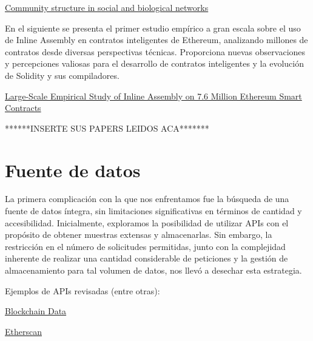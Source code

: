 \documentclass{article}
\begin{document}
\href{https://www.ncbi.nlm.nih.gov/pmc/articles/PMC122977/pdf/pq1202007821.pdf}{Community structure in social and
biological networks}
\newline

En el siguiente se presenta el primer estudio empírico a gran escala sobre el uso de Inline Assembly en contratos inteligentes de Ethereum, analizando millones de contratos desde diversas perspectivas técnicas. Proporciona nuevas observaciones y percepciones valiosas para el desarrollo de contratos inteligentes y la evolución de Solidity y sus compiladores.

\href{https://drive.google.com/file/d/111l8_vf7Gt7RxygjuBM8WQWLTQL700jY/view}{Large-Scale Empirical Study of Inline Assembly on 7.6 Million Ethereum Smart Contracts}
\newline

******INSERTE SUS PAPERS LEIDOS ACA*******

\section{Fuente de datos}

La primera complicación con la que nos enfrentamos fue la búsqueda de una fuente de datos íntegra, sin limitaciones significativas en términos de cantidad y accesibilidad. Inicialmente, exploramos la posibilidad de utilizar APIs con el propósito de obtener muestras extensas y almacenarlas. Sin embargo, la restricción en el número de solicitudes permitidas, junto con la complejidad inherente de realizar una cantidad considerable de peticiones y la gestión de almacenamiento para tal volumen de datos, nos llevó a desechar esta estrategia.

Ejemplos de APIs revisadas (entre otras):
\begin{list}{}{\leftmargin=4em}
    \item \href{https://www.blockchain.com/explorer/api/blockchain_api}{Blockchain Data} 
    \item \href{https://etherscan.io/apis}{Etherscan}
\end{list}
\end{document}
